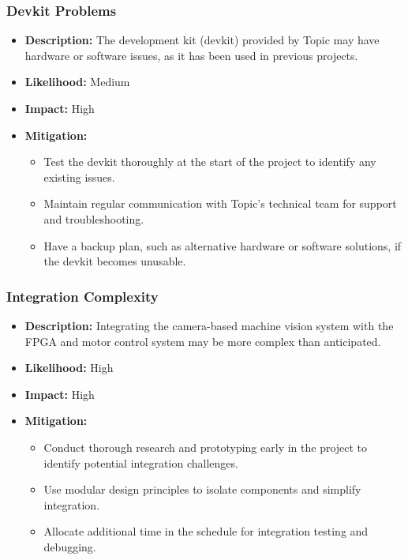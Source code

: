 \documentclass{article}
\begin{document}
\subsubsection{Devkit Problems}
\begin{itemize}
    \item \textbf{Description:} The development kit (devkit) provided by Topic may have hardware or software issues, as it has been used in previous projects.
    \item \textbf{Likelihood:} Medium
    \item \textbf{Impact:} High
    \item \textbf{Mitigation:}
        \begin{itemize}
            \item Test the devkit thoroughly at the start of the project to identify any existing issues.
            \item Maintain regular communication with Topic's technical team for support and troubleshooting.
            \item Have a backup plan, such as alternative hardware or software solutions, if the devkit becomes unusable.
        \end{itemize}
\end{itemize}

\subsubsection{Integration Complexity}
\begin{itemize}
    \item \textbf{Description:} Integrating the camera-based machine vision system with the FPGA and motor control system may be more complex than anticipated.
    \item \textbf{Likelihood:} High
    \item \textbf{Impact:} High
    \item \textbf{Mitigation:}
        \begin{itemize}
            \item Conduct thorough research and prototyping early in the project to identify potential integration challenges.
            \item Use modular design principles to isolate components and simplify integration.
            \item Allocate additional time in the schedule for integration testing and debugging.
        \end{itemize}
\end{itemize}
\end{document}
